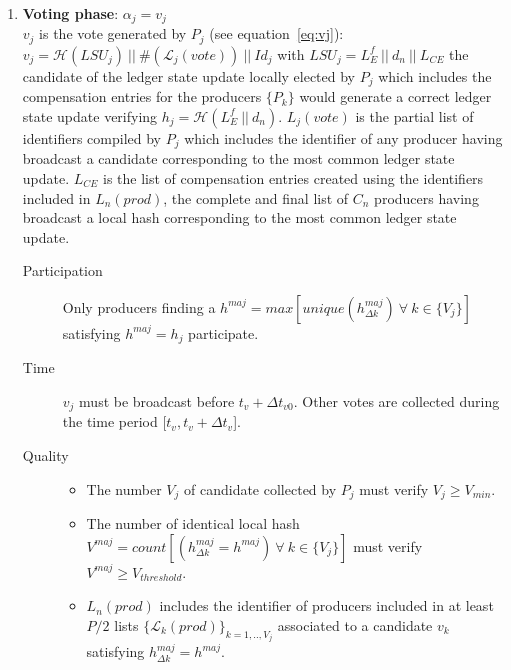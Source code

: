 \begin{enumerate}
\item \textbf{Voting phase}: $\alpha_j = v_j$\\
$v_j$ is the vote generated by $P_j$ (see equation~\ref{eq:vj}): $v_j = \mathcal{H}(LSU_j)~||~\#(\mathcal{L}_j(vote))~||~Id_j$ with $LSU_j = L^f_E~||~d_n~||~L_{CE}$ the candidate of the ledger state update locally elected by $P_j$ which includes the compensation entries for the producers $\{P_k\}$ would generate a correct ledger state update verifying $h_j = \mathcal{H}(L^f_E~||~d_n)$. $L_j(vote)$ is the partial list of identifiers compiled by $P_j$ which includes the identifier of any producer having broadcast a candidate corresponding to the most common ledger state update. $L_{CE}$ is the list of compensation entries created using the identifiers included in $L_n(prod)$, the complete and final list of $C_n$ producers having broadcast a local hash corresponding to the most common ledger state update.
\begin{description}
\item[Participation] Only producers finding a $h^{maj} = max[unique(h^{maj}_{\Delta k})~\forall~k\in\{V_j\}]$ satisfying $h^{maj} = h_j$ participate.
\item[Time] $v_j$ must be broadcast before $t_v + \Delta t_{v0}$. Other votes are collected during the time period [$t_v, t_v + \Delta t_{v}$].
\item[Quality] 
\begin{itemize}
\item The number $V_j$ of candidate collected by $P_j$ must verify $V_j \geq V_{min}$.
\item The number of identical local hash $V^{maj} = count[(h^{maj}_{\Delta k} = h^{maj})~\forall~k\in\{V_j\}]$ must verify $V^{maj} \geq V_{threshold}$.
\item $L_n(prod)$ includes the identifier of producers included in at least $P/2$ lists $\{\mathcal{L}_{k}(prod)\}_{k=1,..,V_j}$ associated to a candidate $v_{k}$ satisfying $h^{maj}_{\Delta k} = h^{maj}$.
\end{itemize}
\end{description}


\end{enumerate}
